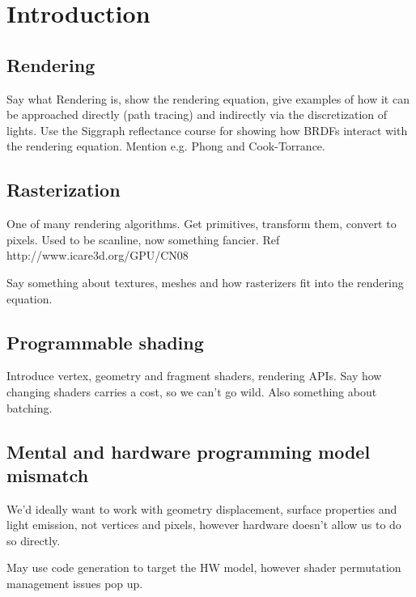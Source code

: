 
\chapter{ Introduction }
\label{Chapter1}

\section{Rendering}

Say what Rendering is, show the rendering equation, give examples of how it can be approached directly (path tracing) and indirectly via the discretization of lights. Use the Siggraph reflectance course for showing how BRDFs interact with the rendering equation. Mention e.g. Phong and Cook-Torrance.

\section{Rasterization}

One of many rendering algorithms. Get primitives, transform them, convert to pixels. Used to be scanline, now something fancier. Ref http://www.icare3d.org/GPU/CN08

Say something about textures, meshes and how rasterizers fit into the rendering equation.

\section{Programmable shading}

Introduce vertex, geometry and fragment shaders, rendering APIs. Say how changing shaders carries a cost, so we can't go wild. Also something about batching.

\section{Mental and hardware programming model mismatch}

We'd ideally want to work with geometry displacement, surface properties and light emission, not vertices and pixels, however hardware doesn't allow us to do so directly.

May use code generation to target the HW model, however shader permutation management issues pop up.
